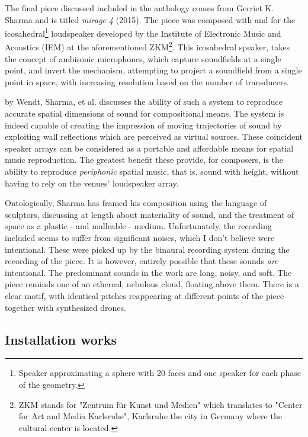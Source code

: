 The final piece discussed included in the anthology comes from Gerriet K. Sharma and is titled \textit{mirage 4} (2015). The piece was composed with and for the icosahedral\footnote{Speaker approximating a sphere with 20 faces and one speaker for each phase of the geometry.} loudspeaker developed by the Institute of Electronic Music and Acoustics (IEM) at the aforementioned ZKM\footnote{ZKM stands for "Zentrum für Kunst und Medien" which translates to "Center for Art and Media Karlsruhe", Karlsruhe the city in Germany where the cultural center is located.}. This icosahedral speaker, takes the concept of ambisonic microphones, which capture soundfields at a single point, and invert the mechanism, attempting to project a soundfield from a single point in space, with increasing resolution based on the number of transducers. 

\cite{wendt2017perception} by Wendt, Sharma, et al. discusses the ability of such a system to reproduce accurate spatial dimensions of sound for compositional means. The system is indeed capable of creating the impression of moving trajectories of sound by exploiting wall reflections which are perceived as virtual sources. These coincident speaker arrays can be considered as a portable and affordable means for spatial music reproduction. The greatest benefit these provide, for composers, is the ability to reproduce \textit{periphonic} spatial music, that is, sound with height, without having to rely on the venues' loudspeaker array. 

Ontologically, Sharma has framed his composition using the language of sculptors, discussing at length about materiality of sound, and the treatment of space as a plastic - and malleable - medium. Unfortunately, the recording included seems to suffer from significant noises, which I don't believe were intentional. These were picked up by the binaural recording system during the recording of the piece. It is however, entirely possible that these sounds \textit{are} intentional. The predominant sounds in the work are long, noisy, and soft. The piece reminds one of an ethereal, nebulous cloud, floating above them. There is a clear motif, with identical pitches reappearing at different points of the piece together with synthesized drones. 

\subsection{Installation works}

